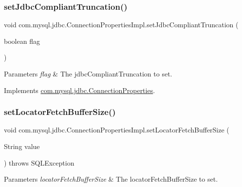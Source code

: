 \subsubsection{\texorpdfstring{set\+Jdbc\+Compliant\+Truncation()}{setJdbcCompliantTruncation()}}
{\footnotesize\ttfamily void com.\+mysql.\+jdbc.\+Connection\+Properties\+Impl.\+set\+Jdbc\+Compliant\+Truncation (\begin{DoxyParamCaption}\item[{boolean}]{flag }\end{DoxyParamCaption})}


\begin{DoxyParams}{Parameters}
{\em flag} & The jdbc\+Compliant\+Truncation to set. \\
\hline
\end{DoxyParams}


Implements \mbox{\hyperlink{interfacecom_1_1mysql_1_1jdbc_1_1_connection_properties_aa770c64e002c6ab1cb335107d0380476}{com.\+mysql.\+jdbc.\+Connection\+Properties}}.

\mbox{\label{classcom_1_1mysql_1_1jdbc_1_1_connection_properties_impl_a1214ced2b9a6dbbaebd36c45acb2538b}} 
\subsubsection{\texorpdfstring{set\+Locator\+Fetch\+Buffer\+Size()}{setLocatorFetchBufferSize()}}
{\footnotesize\ttfamily void com.\+mysql.\+jdbc.\+Connection\+Properties\+Impl.\+set\+Locator\+Fetch\+Buffer\+Size (\begin{DoxyParamCaption}\item[{String}]{value }\end{DoxyParamCaption}) throws S\+Q\+L\+Exception}


\begin{DoxyParams}{Parameters}
{\em locator\+Fetch\+Buffer\+Size} & The locator\+Fetch\+Buffer\+Size to set. \\
\hline
\end{DoxyParams}


